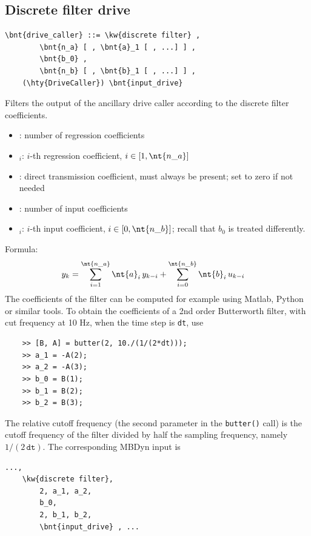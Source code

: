 \subsection{Discrete filter drive}
\begin{Verbatim}[commandchars=\\\{\}]
    \bnt{drive_caller} ::= \kw{discrete filter} ,
        \bnt{n_a} [ , \bnt{a}_1 [ , ...] ] ,
        \bnt{b_0} ,
        \bnt{n_b} [ , \bnt{b}_1 [ , ...] ] ,
	(\hty{DriveCaller}) \bnt{input_drive}
\end{Verbatim}
Filters the output of the ancillary drive caller  according to the discrete filter coefficients.
\begin{itemize}
\item {}: number of regression coefficients
\item {}$_i$: $i$-th regression coefficient, $i \in [1, \nt{n\_a}]$
\item {}: direct transmission coefficient, must always be present; set to zero if not needed
\item {}: number of input coefficients
\item {}$_i$: $i$-th input coefficient, $i \in [0, \nt{n\_b}]$;
recall that $b_0$ is treated differently.
\end{itemize}
Formula:
\begin{align}
	y_k &=
	\sum_{i=1}^{\nt{n\_a}} \nt{a}_i \, y_{k-i}
	+ \sum_{i=0}^{\nt{n\_b}} \nt{b}_i \, u_{k-i}
\end{align}
The coefficients of the filter can be computed for example using Matlab, Python
or similar tools.
To obtain the coefficients of a 2nd order Butterworth filter,
with cut frequency at 10 Hz, when the time step is \texttt{dt}, use
\begin{verbatim}
    >> [B, A] = butter(2, 10./(1/(2*dt)));
    >> a_1 = -A(2);
    >> a_2 = -A(3);
    >> b_0 = B(1);
    >> b_1 = B(2);
    >> b_2 = B(3);
\end{verbatim}
The relative cutoff frequency (the second parameter in the \texttt{butter()} call)
is the cutoff frequency of the filter divided by half the sampling frequency,
namely $1/(2 \, \texttt{dt})$.
The corresponding MBDyn input is
\begin{Verbatim}[commandchars=\\\{\}]
    ...,
    \kw{discrete filter},
        2, a_1, a_2,
        b_0,
        2, b_1, b_2,
        \bnt{input_drive} , ...
\end{Verbatim}

